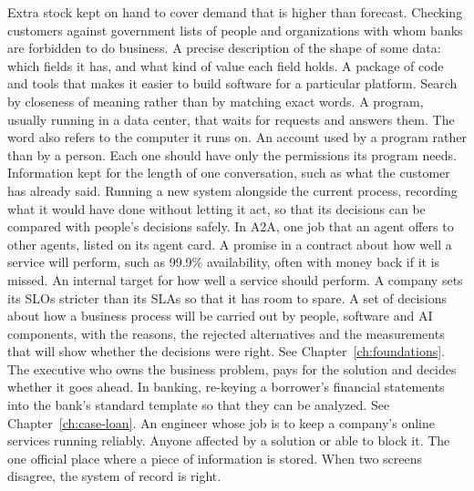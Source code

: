 \begin{description}[style=nextline, leftmargin=1.2em, itemsep=4pt, font=\normalfont\bfseries\sffamily\small]
 Extra stock kept on hand to cover demand that is higher than forecast.
 Checking customers against government lists of people and organizations with whom banks are forbidden to do business.
 A precise description of the shape of some data: which fields it has, and what kind of value each field holds.
 A package of code and tools that makes it easier to build software for a particular platform.
 Search by closeness of meaning rather than by matching exact words.
 A program, usually running in a data center, that waits for requests and answers them. The word also refers to the computer it runs on.
 An account used by a program rather than by a person. Each one should have only the permissions its program needs.
 Information kept for the length of one conversation, such as what the customer has already said.
 Running a new system alongside the current process, recording what it would have done without letting it act, so that its decisions can be compared with people's decisions safely.
 In A2A, one job that an agent offers to other agents, listed on its agent card.
 A promise in a contract about how well a service will perform, such as 99.9\% availability, often with money back if it is missed.
 An internal target for how well a service should perform. A company sets its SLOs stricter than its SLAs so that it has room to spare.
 A set of decisions about how a business process will be carried out by people, software and AI components, with the reasons, the rejected alternatives and the measurements that will show whether the decisions were right. See Chapter~\ref{ch:foundations}.
 The executive who owns the business problem, pays for the solution and decides whether it goes ahead.
 In banking, re-keying a borrower's financial statements into the bank's standard template so that they can be analyzed. See Chapter~\ref{ch:case-loan}.
 An engineer whose job is to keep a company's online services running reliably.
 Anyone affected by a solution or able to block it.
 The one official place where a piece of information is stored. When two screens disagree, the system of record is right.


\end{description}
